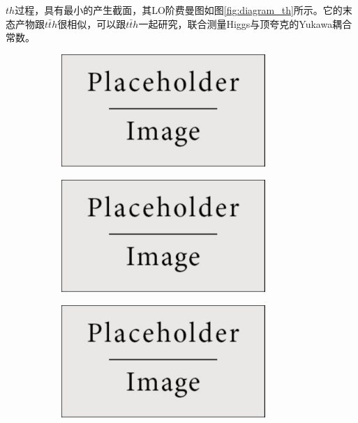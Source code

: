 $th$过程，具有最小的产生截面，其LO阶费曼图如图\ref{fig:diagram_th}所示。它的末态产物跟$t\bar{t}h$很相似，可以跟$t\bar{t}h$一起研究，联合测量Higgs与顶夸克的Yukawa耦合常数。\\
\begin{figure}[h]
\centering
 \begin{subfigure}[b]{0.33\textwidth}
  \includegraphics[width=0.85\textwidth]{fig/placeholder.pdf}
  \caption{}
  \label{fig:diagram_VH}
 \end{subfigure}
 \begin{subfigure}[b]{0.33\textwidth}
  \includegraphics[width=0.85\textwidth]{fig/placeholder.pdf}
  \caption{}
  \label{fig:diagram_ggzh1}
 \end{subfigure}
 \begin{subfigure}[b]{0.33\textwidth}
  \includegraphics[width=0.85\textwidth]{fig/placeholder.pdf}

\end{subfigure}
\end{figure}
